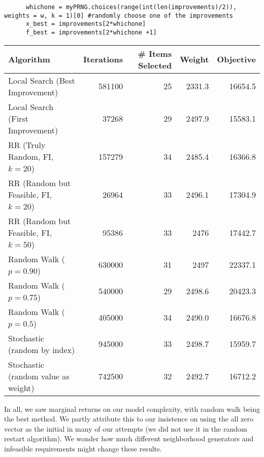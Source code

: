 \documentclass[11pt]{article}
\begin{document}
\begin{enumerate}
\begin{verbatim}
      whichone = myPRNG.choices(range(int(len(improvements)/2)), weights = w, k = 1)[0] #randomly choose one of the improvements
      x_best = improvements[2*whichone]
      f_best = improvements[2*whichone +1]
\end{verbatim}
\begin{tabular}{lrrrr}
Algorithm&Iterations&\# Items Selected&Weight&Objective\\ \hline
Local Search (Best Improvement)&581100&25&2331.3&16654.5\\ 
Local Search (First Improvement)&37268&29&2497.9&15583.1\\
RR (Truly Random, FI, $k=20$) & 157279&34&2485.4&16366.8\\
RR (Random but Feasible, FI, $k = 20$)& 26964&33&2496.1&17304.9\\
RR (Random but Feasible, FI, $k = 50$)& 95386&33&2476&17442.7\\
Random Walk ($p = 0.90$) & 630000&31&2497&22337.1\\
Random Walk ($p = 0.75$) & 540000&29&2498.6&20423.3\\
Random Walk ($p = 0.5$) & 405000&34&2490.0&16676.8\\
Stochastic (random by index) &945000&33&2498.7&15959.7\\
Stochastic (random value as weight)&742500&32&2492.7&16712.2\\
\hline
\end{tabular}

\end{enumerate}
In all, we saw marginal returns on our model complexity, with random walk being the best method.  We partly attribute this to our insistence on using the all zero vector as the initial in many of our attempts (we did not use it in the random restart algorithm).  We wonder how much different neighborhood generators and infeasible requirements might change these results.
\end{document}
